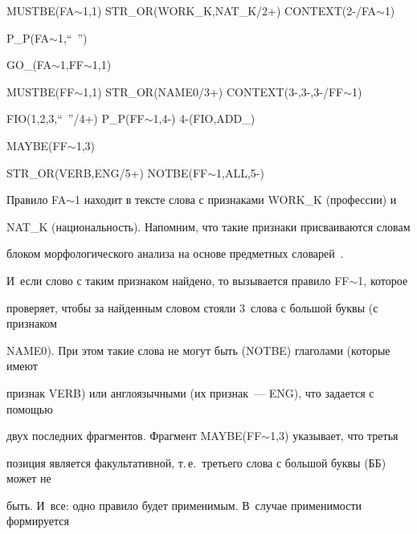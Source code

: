 {\sf MUSTBE(FA$\sim$1,1) STR\_OR(WORK\_K,NAT\_K/2+) CONTEXT(2-/FA$\sim$1) 





  P\_P(FA$\sim$1,``\ '') 





  GO\_(FA$\sim$1,FF$\sim$1,1)





\smallskip





   MUSTBE(FF$\sim$1,1) STR\_OR(NAME0/3+) CONTEXT(3-,3-,3-/FF$\sim$1)





        FIO(1,2,3,``\ ''/4+) P\_P(FF$\sim$1,4-)  4-(FIO,ADD\_)





        MAYBE(FF$\sim$1,3)





        STR\_OR(VERB,ENG/5+) NOTBE(FF$\sim$1,ALL,5-) }





Правило {\sf FA$\sim$1} находит в тексте слова с признаками {\sf WORK\_K} (профессии) и 


{\sf NAT\_K} (национальность). Напомним, что такие признаки присваиваются словам 


блоком морфологического анализа на основе предметных словарей~\cite{9-2-10}. 


И~если  слово с таким признаком найдено, то вызывается правило {\sf FF$\sim$1}, которое 


проверяет, чтобы за найденным словом стояли 3~слова с большой буквы (с признаком 


{\sf NAME0}). При этом такие слова не могут быть ({\sf NOTBE}) глаголами (которые имеют 


признак {\sf VERB}) или англоязычными (их признак~--- {\sf ENG}), что задается с помощью 


двух последних фрагментов. Фрагмент {\sf MAYBE(FF$\sim$1,3)} указывает, что третья 


позиция является факультативной, т.\,е.\ третьего слова с большой буквы (ББ) может не 


быть. И~все: одно правило будет применимым. В~случае применимости формируется 


